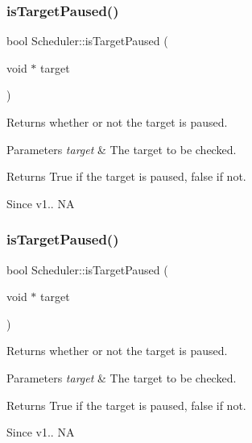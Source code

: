 \subsubsection{\texorpdfstring{is\+Target\+Paused()}{isTargetPaused()}\hspace{0.1cm}{\footnotesize\ttfamily [1/2]}}
{\footnotesize\ttfamily bool Scheduler\+::is\+Target\+Paused (\begin{DoxyParamCaption}\item[{void $\ast$}]{target }\end{DoxyParamCaption})}

Returns whether or not the target is paused. 
\begin{DoxyParams}{Parameters}
{\em target} & The target to be checked. \\
\hline
\end{DoxyParams}
\begin{DoxyReturn}{Returns}
True if the target is paused, false if not. 
\end{DoxyReturn}
\begin{DoxySince}{Since}
v1..  NA 
\end{DoxySince}
\mbox{\label{classScheduler_aef17d4d358516d712c32ac421202198c}} 
\subsubsection{\texorpdfstring{is\+Target\+Paused()}{isTargetPaused()}\hspace{0.1cm}{\footnotesize\ttfamily [2/2]}}
{\footnotesize\ttfamily bool Scheduler\+::is\+Target\+Paused (\begin{DoxyParamCaption}\item[{void $\ast$}]{target }\end{DoxyParamCaption})}

Returns whether or not the target is paused. 
\begin{DoxyParams}{Parameters}
{\em target} & The target to be checked. \\
\hline
\end{DoxyParams}
\begin{DoxyReturn}{Returns}
True if the target is paused, false if not. 
\end{DoxyReturn}
\begin{DoxySince}{Since}
v1..  NA 
\end{DoxySince}
\mbox{\label{classScheduler_a3c551579277e1746f260d8397b4ac6ee}} 
